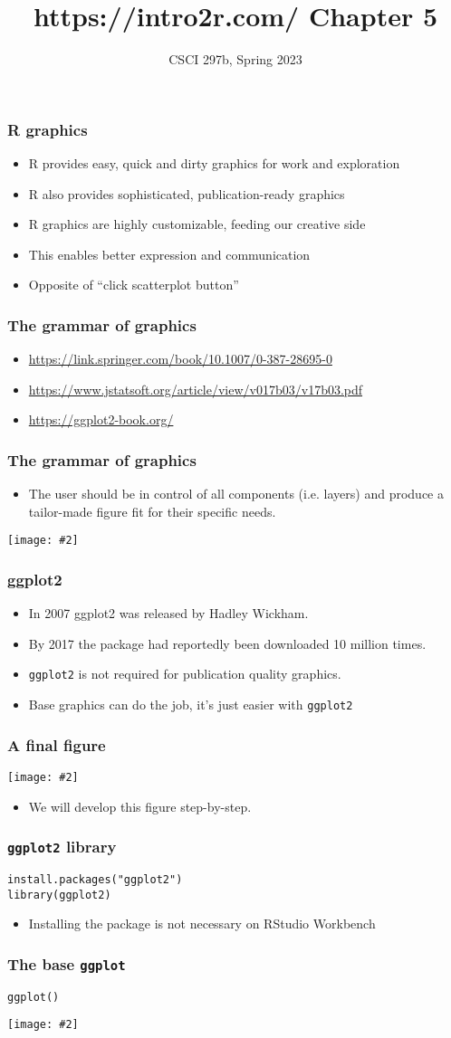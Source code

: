 \documentclass{beamer}
\title{{https://intro2r.com/} Chapter 5}
\author{CSCI 297b, Spring 2023}
\newcommand{\bi}{\begin{itemize}}
\newcommand{\li}{\item}
\newcommand{\ei}{\end{itemize}}
\newcommand{\fig}[2]{\centerline{\texttt{[image: \#2]}}}
\newcommand{\bfr}[1]{\begin{frame}[fragile]\frametitle{{ #1 }}}
\begin{document}
\begin{frame}
\maketitle
\end{frame}

\bfr{R graphics}
\bi
\li  R provides easy, quick and dirty graphics for work and exploration
\li R also provides sophisticated, publication-ready graphics
\li R graphics are highly customizable, feeding our creative side
\li This enables better expression and communication
\li Opposite of ``click scatterplot button''
\ei
\end{frame}

\bfr{The grammar of graphics}
\bi
\li \url{https://link.springer.com/book/10.1007/0-387-28695-0}
\li \url{https://www.jstatsoft.org/article/view/v017b03/v17b03.pdf}
\li  \url{https://ggplot2-book.org/}
\ei
\end{frame}

\bfr{The grammar of graphics}
\bi
\li The user should be in control of all components (i.e. layers) and produce a tailor-made figure fit for their specific needs. 
\ei

\fig{0.5}{full_connected.png}

\end{frame}

\bfr{ggplot2}
\bi
\li In 2007 ggplot2 was released by Hadley Wickham. 
\li By 2017 the package had reportedly been downloaded 10 million times.
\li {\tt ggplot2} is not required for publication quality graphics.
\li Base graphics can do the job, it's just easier with {\tt ggplot2}
\ei

\end{frame}

\bfr{A final figure}
\fig{.9}{final-figure-start-1.png}
\bi
\li We will develop this figure step-by-step.
\ei
\end{frame}

\bfr{{\tt ggplot2} library}
\begin{verbatim}
install.packages("ggplot2")
library(ggplot2)
\end{verbatim}
\bi
\li Installing the package is not necessary on RStudio Workbench
\ei
\end{frame}

\bfr{The base {\tt ggplot}}
\begin{verbatim}
ggplot()
\end{verbatim}
\fig{.8}{pure-ggplot-1.png}
\end{frame}
\end{document}

